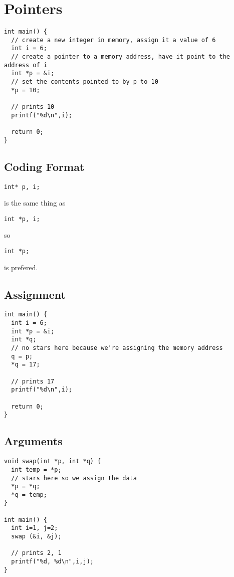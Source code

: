 \documentclass[12pt]{article}
\begin{document}
\section*{Pointers}
\begin{verbatim}
int main() {
  // create a new integer in memory, assign it a value of 6
  int i = 6;
  // create a pointer to a memory address, have it point to the address of i
  int *p = &i;
  // set the contents pointed to by p to 10
  *p = 10;
  
  // prints 10
  printf("%d\n",i);
  
  return 0;
}
\end{verbatim}

\subsection*{Coding Format}
\begin{verbatim}int* p, i;\end{verbatim} is the same thing as \begin{verbatim}int *p, i;\end{verbatim} so \begin{verbatim}int *p;\end{verbatim} is prefered.

\subsection*{Assignment}
\begin{verbatim}
int main() {
  int i = 6;
  int *p = &i;
  int *q;
  // no stars here because we're assigning the memory address
  q = p;
  *q = 17;
  
  // prints 17
  printf("%d\n",i);
  
  return 0;
}
\end{verbatim}

\subsection*{Arguments}
\begin{verbatim}
void swap(int *p, int *q) {
  int temp = *p;
  // stars here so we assign the data
  *p = *q;
  *q = temp;
}

int main() {
  int i=1, j=2;
  swap (&i, &j);
  
  // prints 2, 1
  printf("%d, %d\n",i,j);
}
\end{verbatim}
\end{document}
